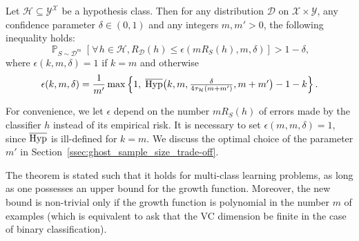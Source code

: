 \documentclass[twoside,11pt]{article}
\let\oldforall=\forall
\renewcommand{\forall}{\hspace{1pt}\oldforall\hspace{1pt}}
\newcommand{\cb}[1]{\left\{#1\right\}}
\newcommand{\D}{\mathcal{D}}
\renewcommand{\H}{{\mathcal{H}}}
\DeclareMathOperator*{\Prob}{\mathds{P}}
\newcommand{\prob}[2]{\Prob_{#1}\left[#2\right]}
\newcommand{\HypInv}{\overline{\textnormal{Hyp}}}
\begin{document}
\begin{theorem}
\label{thm:main}
Let $\H \subseteq \mathcal{Y}^\mathcal{X}$ be a hypothesis class.
Then for any distribution $\D$ on $\mathcal{X} \times \mathcal{Y}$, any confidence parameter $\delta \in (0, 1)$ and any integers $m, m'>0$, the following inequality holds:
\begin{equation*}
\prob{S\sim\D^m}{\forall h \in \H, R_\D(h) \leq \epsilon(m R_S(h), m, \delta)} > 1 - \delta,
\end{equation*}
where $\epsilon(k,m,\delta) = 1$ if $k=m$ and otherwise
\begin{equation*}
\epsilon(k, m, \delta) = \frac{1}{m'} \max\cb{ 1,\; \HypInv\big(k, m, \textstyle\frac{\delta}{4 \tau_\H(m + m')}, m + m'\big) - 1 - k }.
\end{equation*}
\end{theorem}
For convenience, we let $\epsilon$ depend on the number $m R_S(h)$ of errors made by the classifier $h$ instead of its empirical risk.
It is necessary to set $\epsilon(m,m,\delta)=1$, since $\HypInv$ is ill-defined for $k=m$.
We discuss the optimal choice of the parameter $m'$ in Section~\ref{ssec:ghost_sample_size_trade-off}.

The theorem is stated such that it holds for multi-class learning problems, as long as one possesses an upper bound for the growth function.
Moreover, the new bound is non-trivial only if the growth function is polynomial in the number $m$ of examples (which is equivalent to ask that the VC dimension be finite in the case of binary classification).
\smallskip
\end{document}
